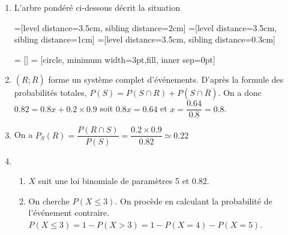 \documentclass[11pt,fleqn, openany]{book} %
\begin{document}
\begin{solution}\hspace{0pt}

\begin{enumerate}
\item L'arbre pondéré ci-dessous décrit la situation


=[level distance=3.5cm, sibling distance=2cm]
=[level distance=3.5cm, sibling distance=1cm]
=[level distance=3.5cm, sibling distance=0.3cm]

 = []
 = [circle, minimum width=3pt,fill, inner sep=0pt]


\begin{center}
\end{center}

\item $(R;\overline{R})$ forme un système complet d'événements. D'après la formule des probabilités totales, $P(S)=P(S\cap R)+P(S\cap \overline{R})$.
On a donc $0.82 = 0.8x+0.2 \times 0.9$ soit $0.8x=0.64$ et $x=\dfrac{0.64}{0.8}=0.8$.
\item On a $P_S(R)=\dfrac{P(R \cap S)}{P(S)}=\dfrac{0.2 \times 0.9}{0.82} \simeq 0.22$

\item 
\begin{enumerate}
\item $X$ suit une loi binomiale de paramètres 5 et 0.82.
\item On cherche $P(X\leqslant 3)$. On procède en calculant la probabilité de l'événement contraire. \\$P(X\leqslant 3)=1-P(X>3)=1-P(X=4)-P(X=5)$.


\end{enumerate}
\end{enumerate}
\end{solution}
\end{document}
